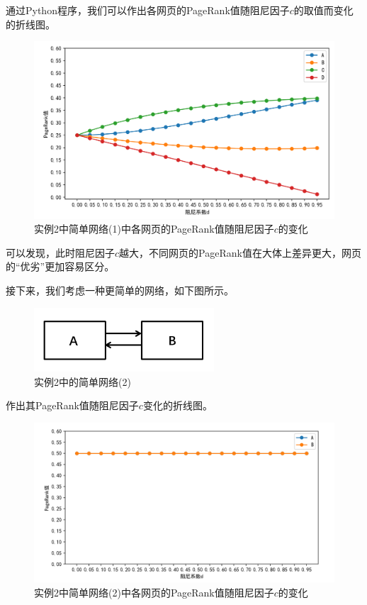 \documentclass[UTF8,openany]{ctexbook}
\begin{document}
通过Python程序，我们可以作出各网页的PageRank值随阻尼因子$c$的取值而变化的折线图。

\begin{figure}[H]
    \begin{center}
        \includegraphics[width=1\textwidth]{images/pic2(1).png}
        \caption{实例2中简单网络(1)中各网页的PageRank值随阻尼因子$c$的变化}
    \end{center}
\end{figure}
可以发现，此时阻尼因子$c$越大，不同网页的PageRank值在大体上差异更大，网页的“优劣”更加容易区分。

接下来，我们考虑一种更简单的网络，如下图所示。
\begin{figure}[H]
    \begin{center}
        \includegraphics[width=0.6\textwidth]{images/pic2-2.png}
        \caption{实例2中的简单网络(2)}
    \end{center}
\end{figure}

作出其PageRank值随阻尼因子$c$变化的折线图。
\begin{figure}[H]
    \begin{center}
        \includegraphics[width=1\textwidth]{images/pic2(2).png}
        \caption{实例2中简单网络(2)中各网页的PageRank值随阻尼因子$c$的变化}
    \end{center}
\end{figure}
\end{document}
